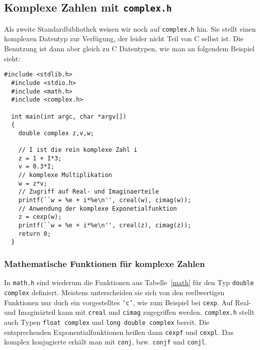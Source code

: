 \subsection{Komplexe Zahlen mit \texttt{complex.h}}

Als zweite Standardbibliothek weisen wir noch auf \texttt{complex.h} hin.
Sie stellt einen komplexen Datentyp zur Verfügung, der leider nicht Teil von C selbst ist.
Die Benutzung ist dann aber gleich zu C Datentypen, wie man an folgendem Beispiel sieht:
\begin{lstlisting}[caption={Beispiel für komplexe Zahlen}, belowcaptionskip=0.3em]
  #include <stdlib.h>
  #include <stdio.h>
  #include <math.h>
  #include <complex.h>
  
  int main(int argc, char *argv[])
  {
    double complex z,v,w;

    // I ist die rein komplexe Zahl i
    z = 1 + I*3;
    v = 0.3*I;
    // komplexe Multiplikation
    w = z*v;
    // Zugriff auf Real- und Imaginaerteile
    printf(``w = %e + i*%e\n'', creal(w), cimag(w));
    // Anwendung der komplexe Exponetialfunktion
    z = cexp(w);
    printf(``w = %e + i*%e\n'', creal(z), cimag(z));
    return 0;
  }
\end{lstlisting}

\subsubsection{Mathematische Funktionen für komplexe Zahlen}

In \texttt{math.h} sind wiederum die Funktionen aus Tabelle~\ref{math} für den Typ \texttt{double complex} definiert.
Meistens unterscheiden sie sich von den reellwertigen Funktionen nur duch ein vorgestelltes \texttt{'c'}, wie zum Beispiel bei \texttt{cexp}.
Auf Real- und Imaginärteil kann mit \texttt{creal} und \texttt{cimag} zugegriffen werden.
\texttt{complex.h} stellt auch Typen \texttt{float complex} und \texttt{long double complex} bereit.
Die entsprechenden Exponentialfunktionen heißen dann \texttt{cexpf} und \texttt{cexpl}.
Das komplex konjugierte erhält man mit \texttt{conj}, bzw. \texttt{conjf} und \texttt{conjl}.
